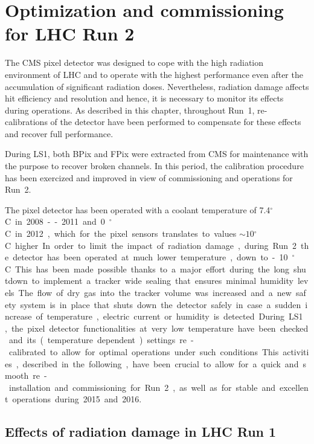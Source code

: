 \chapter{Optimization and commissioning for LHC Run 2}\label{ch:BPixCalib}

The CMS pixel detector was designed to cope with the high radiation environment of LHC and to operate with the highest performance even after the accumulation of significant radiation doses.
Nevertheless, radiation damage affects hit efficiency and resolution and hence, it is necessary to monitor its effects during operations.
As described in this chapter, throughout Run~1, re-calibrations of the detector have been performed to compensate for these effects and recover full performance.

During LS1, both BPix and FPix were extracted from CMS for maintenance with the purpose to recover broken channels.
In this period, the calibration procedure has been exercized and improved in view of commissioning and operations for Run~2.

The pixel detector has been operated with a coolant temperature of 7.4\unit{$^\circ$C} in 2008--2011 and 0\unit{$^\circ$C} in 2012, which for the pixel sensors translates to values $\sim10$\unit{$^\circ$C} higher.
In order to limit the impact of radiation damage, during Run~2 the detector has been operated at much lower temperature, down to -10\unit{$^\circ$C}.
This has been made possible thanks to a major effort during the long shutdown to implement a tracker wide sealing that ensures minimal humidity levels.
The flow of dry gas into the tracker volume was increased and a new safety system is in place that shuts down the detector safely in case a sudden increase of temperature, electric current or humidity is detected. 
During LS1, the pixel detector functionalities at very low temperature have been checked and its (temperature dependent) settings re-calibrated to allow for optimal operations under such conditions.
This activities, described in the following, have been crucial to allow for a quick and smooth re-installation and commissioning for Run~2, as well as for stable and excellent operations during 2015 and 2016.

\section{Effects of radiation damage in LHC Run 1}

